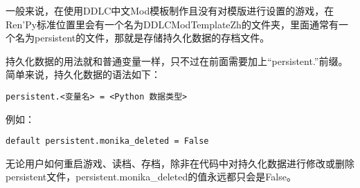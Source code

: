 一般来说，在使用DDLC中文Mod模板制作且没有对模版进行设置的游戏，在Ren'Py标准位置里会有一个名为DDLCModTemplateZh的文件夹，里面通常有一个名为persistent的文件，那就是存储持久化数据的存档文件。

持久化数据的用法就和普通变量一样，只不过在前面需要加上“persistent.”前缀。简单来说，持久化数据的语法如下：

\begin{lstlisting}
persistent.<变量名> = <Python 数据类型>
\end{lstlisting}

例如：
\begin{lstlisting}
default persistent.monika_deleted = False
\end{lstlisting}

无论用户如何重启游戏、读档、存档，除非在代码中对持久化数据进行修改或删除persistent文件，persistent.monika\_deleted的值永远都只会是False。